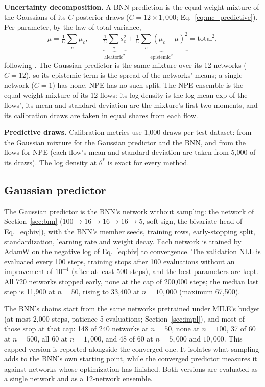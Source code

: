 \documentclass[11pt]{article}
\begin{document}
\textbf{Uncertainty decomposition.} A BNN prediction is the equal-weight mixture of the Gaussians of its $C$
posterior draws ($C=12\times1{,}000$; Eq.~\ref{eq:mc_predictive}). Per parameter, by the law of total variance,
\begin{equation}
\label{eq:decomp}
\bar\mu=\tfrac1C\textstyle\sum_c\mu_c,\qquad
\underbrace{\tfrac1C\textstyle\sum_c s_c^2}_{\text{aleatoric}^2}
+\underbrace{\tfrac1C\textstyle\sum_c(\mu_c-\bar\mu)^2}_{\text{epistemic}^2}
=\text{total}^2 ,
\end{equation}
following \citet{kendall2017uncertainties}. The Gaussian predictor is the same mixture over its 12 networks ($C=12$),
so its epistemic term is the spread of the networks' means; a single network ($C=1$) has none. NPE has no such split.
The NPE ensemble is the equal-weight mixture of its 12 flows: its log density is the log-mean-exp of the flows', its
mean and standard deviation are the mixture's first two moments, and its calibration draws are taken in equal shares
from each flow.

\textbf{Predictive draws.} Calibration metrics use 1{,}000 draws per test dataset: from the Gaussian mixture for the
Gaussian predictor and the BNN, and from the flows for NPE (each flow's mean and standard deviation are taken from
5{,}000 of its draws). The log density at $\theta^*$ is exact for every method.

\subsection{Gaussian predictor}
\label{sec:gauss}
The Gaussian predictor is the BNN's network without sampling: the network of Section~\ref{sec:bnn}
($100\to16\to16\to16\to5$, soft-sign, the bivariate head of Eq.~\eqref{eq:biv}), with the BNN's member seeds, training
rows, early-stopping split, standardization, learning rate and weight decay. Each network is trained by AdamW
\citep{loshchilov2019adamw} on the negative log of Eq.~\eqref{eq:biv} to convergence. The validation NLL is evaluated
every 100 steps, training stops after 100 evaluations without an improvement of $10^{-4}$ (after at least 500 steps),
and the best parameters are kept. All 720 networks stopped early, none at the cap of 200{,}000 steps; the median last
step is 11{,}900 at $n=50$, rising to 33{,}400 at $n=10{,}000$ (maximum 67{,}500).

The BNN's chains start from the same networks pretrained under MILE's budget (at most 2{,}000 steps, patience 5
evaluations; Section~\ref{sec:impl}), and most of those stop at that cap: 148 of 240 networks at $n=50$, none at
$n=100$, 37 of 60 at $n=500$, all 60 at $n=1{,}000$, and 48 of 60 at $n=5{,}000$ and $10{,}000$. This capped version is
reported alongside the converged one. It isolates what sampling adds to the BNN's own starting point, while the
converged predictor measures it against networks whose optimization has finished. Both versions are evaluated as a
single network and as a 12-network ensemble.
\end{document}
